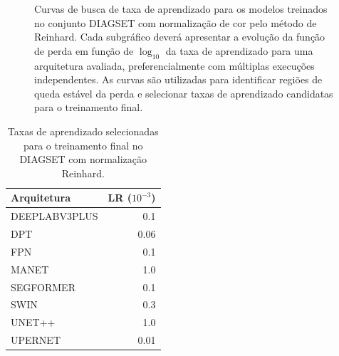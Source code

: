 \begin{figure}[!htb]
\centering


\caption[Curvas de busca de taxa de aprendizado para DIAGSET com Reinhard]{
Curvas de busca de taxa de aprendizado para os modelos treinados no conjunto
DIAGSET com normalização de cor pelo método de Reinhard. Cada subgráfico deverá
apresentar a evolução da função de perda em função de $\log_{10}$ da taxa de
aprendizado para uma arquitetura avaliada, preferencialmente com múltiplas
execuções independentes. As curvas são utilizadas para identificar regiões de
queda estável da perda e selecionar taxas de aprendizado candidatas para o
treinamento final.
}
\label{fig:results_diagset-lr-curves-reinhard}
\end{figure}

\begin{table}[!htb]
\centering
\caption{Taxas de aprendizado selecionadas para o treinamento final no DIAGSET com normalização Reinhard.}
\label{tab:results_diagset-learning-rates-reinhard}
\begin{tabular}{lr}
\toprule
Arquitetura & LR ($10^{-3}$) \\
\midrule
DEEPLABV3PLUS & 0.1 \\
DPT & 0.06 \\
FPN & 0.1 \\
MANET & 1.0 \\
SEGFORMER & 0.1 \\
SWIN & 0.3 \\
UNET++ & 1.0 \\
UPERNET & 0.01 \\
\bottomrule
\end{tabular}
\end{table}
